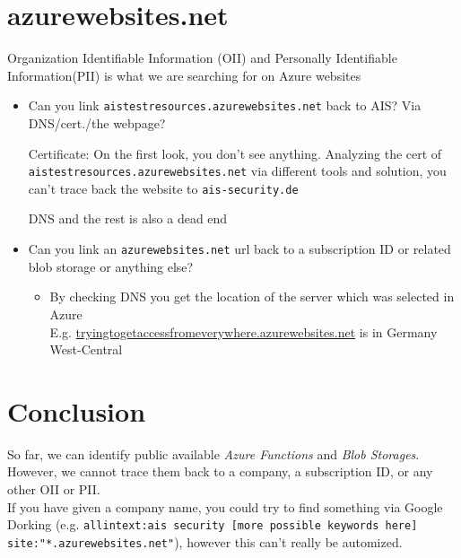 \documentclass[12pt]{article}
\begin{document}
\section*{azurewebsites.net}
Organization Identifiable Information (OII) and Personally Identifiable Information(PII) is what we are searching for on Azure websites
\begin{itemize}
    \item Can you link \verb|aistestresources.azurewebsites.net| back to AIS? Via DNS/cert./the webpage? 
    
    Certificate: On the first look, you don't see anything. Analyzing the cert of \verb|aistestresources.azurewebsites.net| via different tools and solution, you can't trace back the website to \verb|ais-security.de|

    DNS and the rest is also a dead end
    
    \item Can you link an \verb|azurewebsites.net| url back to a subscription ID or related blob storage or anything else? 
    \begin{itemize}
        \item By checking DNS you get the location of the server which was selected in Azure \\
        E.g. \url{tryingtogetaccessfromeverywhere.azurewebsites.net} is in Germany West-Central
    \end{itemize}

\end{itemize}


\section*{Conclusion}
So far, we can identify public available \textit{Azure Functions} and \textit{Blob Storages}. However, we cannot trace them back to a company, a subscription ID, or any other OII or PII.\\
If you have given a company name, you could try to find something via Google Dorking (e.g. \verb|allintext:ais security [more possible keywords here] site:"*.azurewebsites.net"|), however this can't really be automized.
\end{document}
